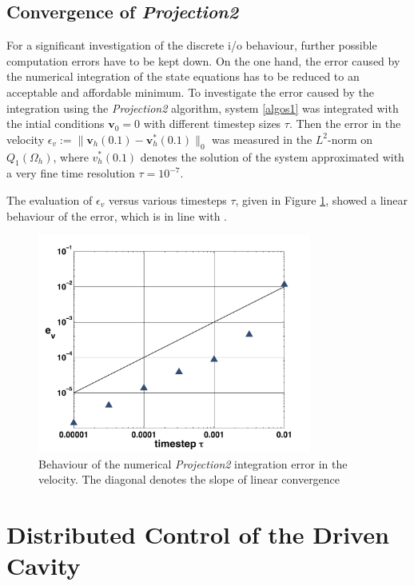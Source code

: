 \documentclass[a4paper,10pt,BCOR=15mm]{scrbook}
\providecommand{\norm}[1]{\lVert#1 \rVert}
\begin{document}
\subsection{Convergence of \textit{Projection2}}
For a significant investigation of the discrete i/o behaviour, further possible computation errors have to be kept down. On the one hand, the error caused by the numerical integration of the state equations has to be reduced to an acceptable and affordable minimum. To investigate the error caused by the integration using the \textit{Projection2} algorithm, system \eqref{algos1} was integrated with the intial conditions $\mathbf v_0=0$ with different timestep sizes $\tau$. Then  the error in the velocity $\epsilon_v:=\norm{\mathbf v_h(0.1) - \mathbf v_h^*(0.1)}_0$ was measured in the $L^2$-norm on $Q_1(\Omega_h)$, where $v_h^*(0.1)$ denotes the solution of the system approximated with a very fine time resolution $\tau = 10^{-7}$.

The evaluation of $\epsilon_v$ versus various timesteps $\tau$, given in Figure \ref{p2conv}, showed a linear behaviour of the error, which is in line with \cite[p.~634]{grc2}.

\begin{figure}[htbp]
\begin{center}
 \includegraphics[width=9cm]{pics/numex/convp2.pdf}
 \caption{Behaviour of the numerical \textit{Projection2} integration error in the velocity. The diagonal denotes the slope of linear convergence}
 \label{p2conv}
\end{center}
\end{figure}

\section{Distributed Control of the Driven Cavity}\label{dcdc}
\end{document}
